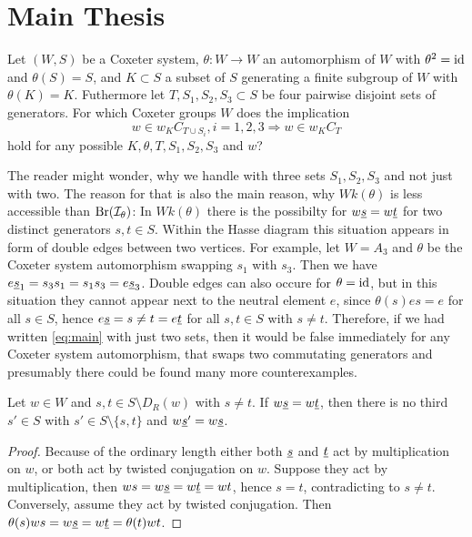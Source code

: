 \section{Main Thesis}
\label{sec:main-thesis}

\begin{ques}
	Let $(W,S)$ be a Coxeter system, $\theta : W \to W$ an automorphism of $W$ with $\theta^2 = \operatorname{id}$ and $\theta(S) = S$, and $K \subset S$ a subset of $S$ generating a finite subgroup of $W$ with $\theta(K) = K$. Futhermore let $T,S_1,S_2,S_3 \subset S$ be four pairwise disjoint sets of generators. For which Coxeter groups $W$ does the implication
	\begin{equation}
		\label{eq:main}
		w \in w_K C_{T \cup S_i}, i=1,2,3 \Rightarrow w \in w_K C_T
	\end{equation}
	hold for any possible $K,\theta,T,S_1,S_2,S_3$ and $w$?
\end{ques}

The reader might wonder, why we handle with three sets $S_1,S_2,S_3$ and not just with two. The reason for that is also the main reason, why $Wk(\theta)$ is less accessible than $\operatorname{Br}(\mathcal{I}_{\theta})$: In $Wk(\theta)$ there is the possibilty for $w \underline{s} = w \underline{t}$ for two distinct generators $s,t \in S$. Within the Hasse diagram this situation appears in form of double edges between two vertices. For example, let $W = A_3$ and $\theta$ be the Coxeter system automorphism swapping $s_1$ with $s_3$. Then we have $e \underline{s}_1 = s_3 s_1 = s_1 s_3 = e \underline{s}_3$. Double edges can also occure for $\theta = \operatorname{id}$, but in this situation they cannot appear next to the neutral element $e$, since $\theta(s)es = e$ for all $s \in S$, hence $e \underline{s} = s \neq t = e \underline{t}$ for all $s,t \in S$ with $s \neq t$. Therefore, if we had written \ref{eq:main} with just two sets, then it would be false immediately for any Coxeter system automorphism, that swaps two commutating generators and presumably there could be found many more counterexamples.

\begin{prop}
	Let $w \in W$ and $s,t \in S \setminus D_R(w)$ with $s \neq t$. If $w \underline{s} = w \underline{t}$, then there is no third $s' \in S$ with $s' \in S \setminus \{s,t\}$ and $w \underline{s}' = w \underline{s}$.

	\begin{proof}
		Because of the ordinary length either both $\underline{s}$ and $\underline{t}$ act by multiplication on $w$, or both act by twisted conjugation on $w$. Suppose they act by multiplication, then $ws = w \underline{s} = w \underline{t} = wt$, hence $s = t$, contradicting to $s \neq t$. Conversely, assume they act by twisted conjugation. Then $\theta(s)ws = w \underline{s} = w \underline{t} = \theta(t)wt$.
	\end{proof}
\end{prop}

